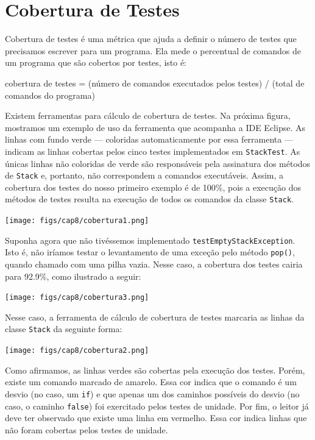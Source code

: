 \documentclass[
  11pt,
  twoside]{book}
\newcommand{\passthrough}[1]{#1}
\renewenvironment{quote}{\centering \vspace{1.5ex} \begin{tcolorbox}[colback=backcolor, width=4.9in]}{\end{tcolorbox}}
\begin{document}
\hypertarget{cobertura-de-testes}{%
\section{Cobertura de Testes}\label{cobertura-de-testes}}

 

 Cobertura de testes é uma métrica
que ajuda a definir o número de testes que precisamos escrever para um
programa. Ela mede o percentual de comandos de um programa que são
cobertos por testes, isto é:

\begin{quote}
cobertura de testes = (número de comandos executados pelos testes) /
(total de comandos do programa)
\end{quote}

Existem ferramentas para cálculo de cobertura de testes. Na próxima
figura, mostramos um exemplo de uso da ferramenta que acompanha a IDE
Eclipse. As linhas com fundo verde --- coloridas automaticamente por
essa ferramenta --- indicam as linhas cobertas pelos cinco testes
implementados em \passthrough{\lstinline!StackTest!}. As únicas linhas
não coloridas de verde são responsáveis pela assinatura dos métodos de
\passthrough{\lstinline!Stack!} e, portanto, não correspondem a comandos
executáveis. Assim, a cobertura dos testes do nosso primeiro exemplo é
de 100\%, pois a execução dos métodos de testes resulta na execução de
todos os comandos da classe \passthrough{\lstinline!Stack!}.

\texttt{[image: figs/cap8/cobertura1.png]}

Suponha agora que não tivéssemos implementado
\passthrough{\lstinline!testEmptyStackException!}. Isto é, não iríamos
testar o levantamento de uma exceção pelo método
\passthrough{\lstinline!pop()!}, quando chamado com uma pilha vazia.
Nesse caso, a cobertura dos testes cairia para 92.9\%, como ilustrado a
seguir:

\texttt{[image: figs/cap8/cobertura3.png]}

Nesse caso, a ferramenta de cálculo de cobertura de testes marcaria as
linhas da classe \passthrough{\lstinline!Stack!} da seguinte forma:

\texttt{[image: figs/cap8/cobertura2.png]}

Como afirmamos, as linhas verdes são cobertas pela execução dos testes.
Porém, existe um comando marcado de amarelo. Essa cor indica que o
comando é um desvio (no caso, um \passthrough{\lstinline!if!}) e que
apenas um dos caminhos possíveis do desvio (no caso, o caminho
\passthrough{\lstinline!false!}) foi exercitado pelos testes de unidade.
Por fim, o leitor já deve ter observado que existe uma linha em
vermelho. Essa cor indica linhas que não foram cobertas pelos testes de
unidade.
\end{document}
